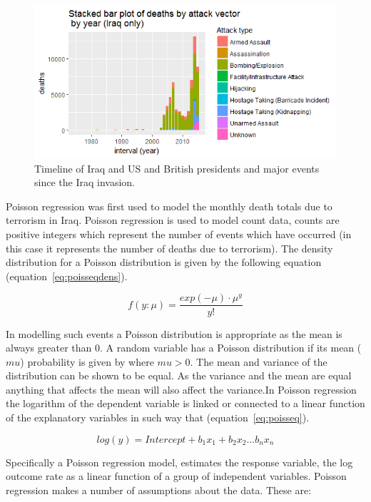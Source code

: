 \begin{figure}[t]
\includegraphics[width=15cm]{Peters_experiment_markdown_files/figure-latex/Rplot01IraqDeaths.png}
\caption{Timeline of Iraq  and US and British presidents and major events since the Iraq invasion.}
\label{fig:deathsiniraq}
\centering
\end{figure}

Poisson regression was first used to model the  monthly death totals due to terrorism in Iraq. Poisson regression is used to model count data, counts are positive integers which represent the number of events which have occurred (in this case it represents the number of deaths due to terrorism). The density distribution for a Poisson distribution is given by the following equation (equation~\ref{eq:poisseqdens}).

\begin{equation} f(y:\mu)= \frac{exp(-\mu)\cdot \mu^y}{y!}  \label{eq:poisseqdens}  \end{equation}

In modelling such events a Poisson distribution is appropriate as the mean is always greater than 0. A random variable has a Poisson distribution if its mean ($mu$)  probability is given by where $mu > 0$. The mean and variance of the distribution can be shown to be equal. As the variance and the mean are equal anything that affects the mean will also affect the variance.In Poisson regression the logarithm of the dependent variable is linked or connected to a linear function of the explanatory variables in such way that (equation~\ref{eq:poisseq}).

\begin{equation} log(y)=Intercept+b_1x_1+b_2x_2...b_nx_n   \label{eq:poisseq}  \end{equation}

Specifically a Poisson regression model, estimates the response variable, the log outcome rate as a linear function of a group of independent variables. Poisson regression makes a number of assumptions about the data. These are:

